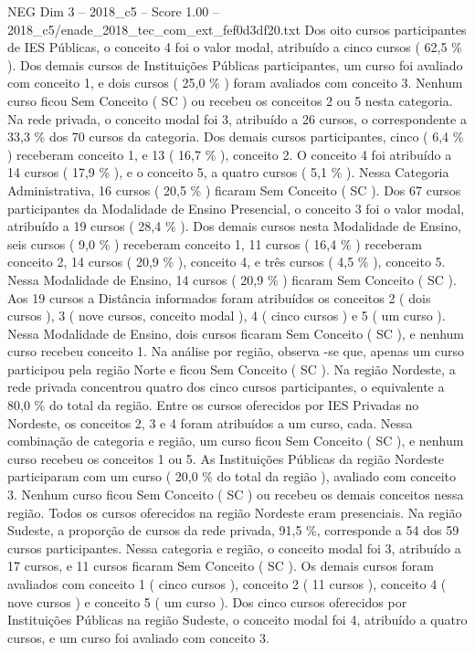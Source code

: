\begin{textsample}{NEG Dim 3 – 2018\_c5 – Score 1.00 – 2018\_c5/enade\_2018\_tec\_com\_ext\_fef0d3df20.txt}
Dos oito cursos participantes de IES Públicas, o conceito 4 foi o valor modal, atribuído a cinco cursos ( 62,5 \% ).
Dos demais cursos de Instituições Públicas participantes, um curso foi avaliado com conceito 1, e dois cursos ( 25,0 \% ) foram avaliados com conceito 3.
Nenhum curso ficou Sem Conceito ( SC ) ou recebeu os conceitos 2 ou 5 nesta categoria.
Na rede privada, o conceito modal foi 3, atribuído a 26 cursos, o correspondente a 33,3 \% dos 70 cursos da categoria.
Dos demais cursos participantes, cinco ( 6,4 \% ) receberam conceito 1, e 13 ( 16,7 \% ), conceito 2.
O conceito 4 foi atribuído a 14 cursos ( 17,9 \% ), e o conceito 5, a quatro cursos ( 5,1 \% ).
Nessa Categoria Administrativa, 16 cursos ( 20,5 \% ) ficaram Sem Conceito ( SC ).
Dos 67 cursos participantes da Modalidade de Ensino Presencial, o conceito 3 foi o valor modal, atribuído a 19 cursos ( 28,4 \% ).
Dos demais cursos nesta Modalidade de Ensino, seis cursos ( 9,0 \% ) receberam conceito 1, 11 cursos ( 16,4 \% ) receberam conceito 2, 14 cursos ( 20,9 \% ), conceito 4, e três cursos ( 4,5 \% ), conceito 5.
Nessa Modalidade de Ensino, 14 cursos ( 20,9 \% ) ficaram Sem Conceito ( SC ).
Aos 19 cursos a Distância informados foram atribuídos os conceitos 2 ( dois cursos ), 3 ( nove cursos, conceito modal ), 4 ( cinco cursos ) e 5 ( um curso ).
Nessa Modalidade de Ensino, dois cursos ficaram Sem Conceito ( SC ), e nenhum curso recebeu conceito 1.
Na análise por região, observa -se que, apenas um curso participou pela região Norte e ficou Sem Conceito ( SC ).
Na região Nordeste, a rede privada concentrou quatro dos cinco cursos participantes, o equivalente a 80,0 \% do total da região.
Entre os cursos oferecidos por IES Privadas no Nordeste, os conceitos 2, 3 e 4 foram atribuídos a um curso, cada.
Nessa combinação de categoria e região, um curso ficou Sem Conceito ( SC ), e nenhum curso recebeu os conceitos 1 ou 5.
As Instituições Públicas da região Nordeste participaram com um curso ( 20,0 \% do total da região ), avaliado com conceito 3.
Nenhum curso ficou Sem Conceito ( SC ) ou recebeu os demais conceitos nessa região.
Todos os cursos oferecidos na região Nordeste eram presenciais.
Na região Sudeste, a proporção de cursos da rede privada, 91,5 \%, corresponde a 54 dos 59 cursos participantes.
Nessa categoria e região, o conceito modal foi 3, atribuído a 17 cursos, e 11 cursos ficaram Sem Conceito ( SC ).
Os demais cursos foram avaliados com conceito 1 ( cinco cursos ), conceito 2 ( 11 cursos ), conceito 4 ( nove cursos ) e conceito 5 ( um curso ).
Dos cinco cursos oferecidos por Instituições Públicas na região Sudeste, o conceito modal foi 4, atribuído a quatro cursos, e um curso foi avaliado com conceito 3.

\end{textsample}
